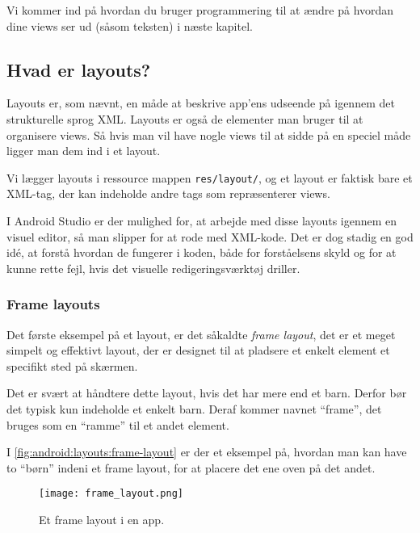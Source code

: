Vi kommer ind på hvordan du bruger programmering til at ændre på hvordan dine views ser ud (såsom teksten) i næste kapitel.

\subsection{Hvad er layouts?}
Layouts er, som nævnt, en måde at beskrive app'ens udseende på igennem det strukturelle sprog XML. Layouts er også de elementer man bruger til at organisere views. Så hvis man vil have nogle views til at sidde på en speciel måde ligger man dem ind i et layout.

Vi lægger layouts i ressource mappen \texttt{res/layout/}, og et layout er 
faktisk bare et XML-tag, der kan indeholde andre tags som repræsenterer views.

I Android Studio er der mulighed for, at arbejde med disse layouts igennem en 
visuel editor, så man slipper for at rode med XML-kode. Det er dog stadig en 
god idé, at forstå hvordan de fungerer i koden, både for forståelsens skyld og 
for at kunne rette fejl, hvis det visuelle redigeringsværktøj driller.

\subsubsection{Frame layouts}

Det første eksempel på et layout, er det såkaldte \textit{frame layout}, det er et meget simpelt og effektivt layout, der er designet til at pladsere et enkelt element et specifikt sted på skærmen.

Det er svært at håndtere dette layout, hvis det har mere end et barn. Derfor bør 
det typisk kun indeholde et enkelt barn. Deraf kommer navnet ``frame'', det 
bruges som en ``ramme'' til et andet element.

I \autoref{fig:android:layouts:frame-layout} er der et eksempel på, hvordan man 
kan have to ``børn'' indeni et frame layout, for at placere det ene oven på det 
andet.

\begin{figure}[h]
	\begin{center}
		\texttt{[image: frame\_layout.png]}
		\caption{Et frame layout i en app.}
		\label{fig:android:layouts:frame-layout}
	\end{center}
\end{figure}

